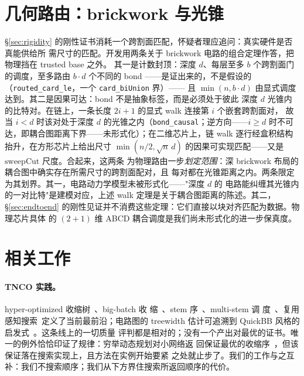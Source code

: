 \documentclass[11pt]{ctexart}
\begin{document}
\section{几何路由：brickwork 与光锥}\label{sec:routing}

\S\ref{sec:rigidity} 的刚性证书消耗一个跨割面匹配，怀疑者理应追问：真实硬件是否真能供给所
需尺寸的匹配。开发用两条关于 brickwork 电路的组合定理作答，把物理挡在 trusted base 之外。
其一是计数封顶：深度 $d$、每层至多 $b$ 个跨割面门的调度，至多路由 $b\cdot d$ 个不同的 bond
——是证出来的，不是假设的（\texttt{routed\_card\_le}，一个 \texttt{card\_biUnion} 界）——
且 $\min(n, b\cdot d)$ 由显式调度达到。其二是因果可达：bond 不是抽象标签，而是必须处于彼此
深度 $d$ 光锥内的比特对。在链上，一条长度 $2i+1$ 的显式 walk 连接第 $i$ 个嵌套跨割面对，
故当 $i<d$ 时该对处于深度 $d$ 的光锥之内（\texttt{bond\_causal}；逆方向——$i\ge d$ 时不可
达，即耦合图距离下界——未形式化）；在二维芯片上，链 walk 逐行经盒积结构抬升，在方形芯片上给出尺寸
$\min(n/2, \sqrt{n}\,d)$ 的因果可实现匹配——又是 $\mathrm{sweepCut}$ 尺度。合起来，这两条
为物理路由一步\emph{划定范围}：深 brickwork 布局的耦合图中确实存在所需尺寸的跨割面配对，且
每对都在光锥距离之内。两条限定为其划界。其一，电路动力学模型未被形式化——"深度 $d$ 的
电路能纠缠其光锥内的一对比特"是建模对应，上述 walk 定理是关于耦合图距离的陈述。其二，
\S\ref{sec:endtoend} 的刚性见证并不消费这些定理：它们直接以块对齐匹配为数据。物理芯片具体
的 $(2{+}1)$ 维 ABCD 耦合调度是我们尚未形式化的进一步保真度。

\section{相关工作}\label{sec:related}

\paragraph{TNCO 实践。}hyper-optimized 收缩树~\cite{gray2021hyper}、big-batch 收
缩~\cite{pan2022solving}、stem 序~\cite{huang2020classical}、multi-stem 调
度~\cite{swtnc2025}、复用感知搜索~\cite{kalachev2021recursive}定义了当前最前沿；电路图的
treewidth 估计可追溯到 QuickBB 风格的启发式~\cite{boixo2017simulation}。这条线上的一切质量
评判都是相对的；没有一个产出对最优的证书。唯一的例外恰恰印证了规律：穷举动态规划对小网络返
回保证最优的收缩序~\cite{pfeifer2014faster}，但该保证落在搜索实现上，且方法在实例开始要紧
之处就止步了。我们的工作与之互补：我们不搜索顺序；我们从下方界住搜索所返回顺序的代价。
\end{document}
